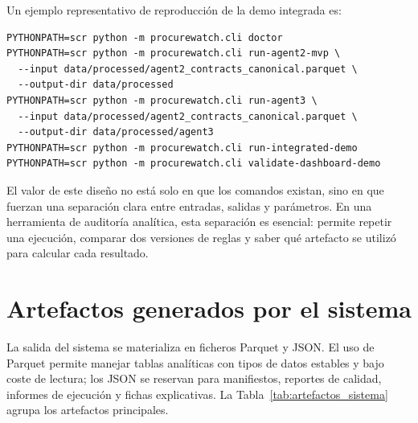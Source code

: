 \documentclass[11pt,a4paper,spanish]{book}
\numberwithin{equation}{chapter}
\numberwithin{figure}{chapter}
\begin{document}
Un ejemplo representativo de reproducci{\'o}n de la demo integrada es:

\begin{lstlisting}
PYTHONPATH=scr python -m procurewatch.cli doctor
PYTHONPATH=scr python -m procurewatch.cli run-agent2-mvp \
  --input data/processed/agent2_contracts_canonical.parquet \
  --output-dir data/processed
PYTHONPATH=scr python -m procurewatch.cli run-agent3 \
  --input data/processed/agent2_contracts_canonical.parquet \
  --output-dir data/processed/agent3
PYTHONPATH=scr python -m procurewatch.cli run-integrated-demo
PYTHONPATH=scr python -m procurewatch.cli validate-dashboard-demo
\end{lstlisting}

El valor de este dise{\~n}o no est{\'a} solo en que los comandos existan, sino en que fuerzan una
separaci{\'o}n clara entre entradas, salidas y par{\'a}metros. En una herramienta de auditor{\'i}a
anal{\'i}tica, esta separaci{\'o}n es esencial: permite repetir una ejecuci{\'o}n, comparar dos
versiones de reglas y saber qu{\'e} artefacto se utiliz{\'o} para calcular cada resultado.

\section{Artefactos generados por el sistema}
\label{sec:artefactos_generados}

La salida del sistema se materializa en ficheros Parquet y JSON. El uso de Parquet permite manejar
tablas anal{\'i}ticas con tipos de datos estables y bajo coste de lectura; los JSON se reservan para
manifiestos, reportes de calidad, informes de ejecuci{\'o}n y fichas explicativas. La
Tabla~\ref{tab:artefactos_sistema} agrupa los artefactos principales.
\end{document}
